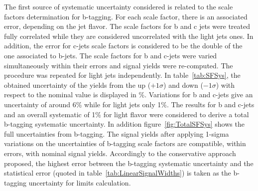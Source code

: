 The first source of systematic uncertainty considered is related to the scale factors determination for b-tagging. For each scale factor, there is an associated error, depending on the jet flavor. The scale factors for b and c jets were treated fully correlated while they are considered uncorrelated with the light jets ones. In addition, the error for c-jets scale factors is considered to be the double of the one associated to b-jets. The scale factors for b and c-jets were varied simultaneously within their errors and signal yields were re-computed. The procedure was repeated for light jets independently. In table~\ref{tab:SFSys}, the obtained uncertainty of the yields from the up ($+1\sigma$) and down ($-1\sigma$) with respect to the nominal value is displayed in \%. Variations for b and c-jets give an uncertainty of around 6\% while for light jets only 1\%. The results for b and c-jets and an overall systematic of 1\% for light flavor were considered to derive a total b-tagging systematic uncertainty. In addition figure~\ref{fig:TotalSFSys} shows the full uncertainties from b-tagging. The signal yields after applying 1-sigma variations on the uncertainties of b-tagging scale factors are compatible, within errors, with nominal signal yields. Accordingly to the conservative approach proposed, the highest error between the b-tagging systematic uncertainty and the statistical error (quoted in table~\ref{tab:LinearSignalWidths}) is taken as the b-tagging uncertainty for limits calculation.

\begin{table*}[htbH]
\begin{center}
\caption{B-tagging uncertainties for signal yields.\label{tab:SFSys}}
\end{center}
\end{table*}

